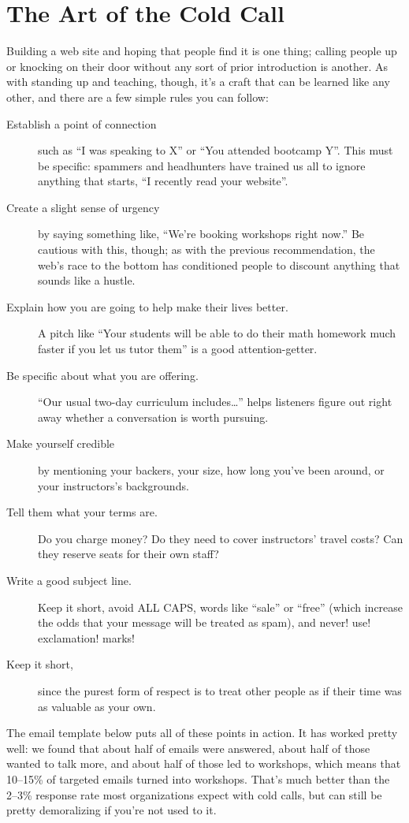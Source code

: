 \section{The Art of the Cold Call}\label{s:marketing-cold-call}

Building a web site and hoping that people find it is one thing; calling
people up or knocking on their door without any sort of prior
introduction is another. As with standing up and teaching, though, it's
a craft that can be learned like any other, and there are a few simple
rules you can follow:

\begin{description}
\item[Establish a point of connection]
such as ``I was speaking to X'' or ``You attended bootcamp Y''. This
must be specific: spammers and headhunters have trained us all to
ignore anything that starts, ``I recently read your website''.
\item[Create a slight sense of urgency]
by saying something like, ``We're booking workshops right now.'' Be
cautious with this, though; as with the previous recommendation, the
web's race to the bottom has conditioned people to discount anything
that sounds like a hustle.
\item[Explain how you are going to help make their lives better.]
A pitch like ``Your students will be able to do their math homework
much faster if you let us tutor them'' is a good attention-getter.
\item[Be specific about what you are offering.]
``Our usual two-day curriculum includes\ldots{}'' helps
listeners figure out right away whether a conversation is worth
pursuing.
\item[Make yourself credible]
by mentioning your backers, your size, how long you've been around,
or your instructors's backgrounds.
\item[Tell them what your terms are.]
Do you charge money? Do they need to cover instructors' travel
costs? Can they reserve seats for their own staff?
\item[Write a good subject line.]
Keep it short, avoid ALL CAPS, words like ``sale'' or ``free'' (which
increase the odds that your message will be treated as spam), and
never! use! exclamation! marks!
\item[Keep it short,]
since the purest form of respect is to treat other people as if
their time was as valuable as your own.
\end{description}

The email template below puts all of these points in action. It has
worked pretty well: we found that about half of emails were answered,
about half of those wanted to talk more, and about half of those led to
workshops, which means that 10--15\% of targeted emails turned into
workshops. That's much better than the 2--3\% response rate most
organizations expect with cold calls, but can still be pretty
demoralizing if you're not used to it.

